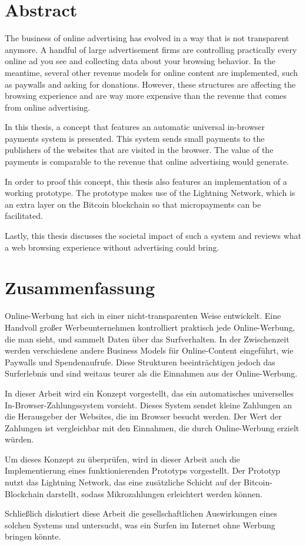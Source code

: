 \chapter*{Abstract}
\label{cha:abstract}
The business of online advertising has evolved in a way that is not transparent anymore. A handful of large advertisement firms are controlling practically every online ad you see and collecting data about your browsing behavior. In the meantime, several other revenue models for online content are implemented, such as paywalls and asking for donations. However, these structures are affecting the browsing experience and are way more expensive than the revenue that comes from online advertising. 

In this thesis, a concept that features an automatic universal in-browser payments system is presented. This system sends small payments to the publishers of the websites that are visited in the browser. The value of the payments is comparable to the revenue that online advertising would generate.

In order to proof this concept, this thesis also features an implementation of a working prototype. The prototype makes use of the Lightning Network, which is an extra layer on the Bitcoin blockchain so that micropayments can be facilitated.

Lastly, this thesis discusses the societal impact of such a system and reviews what a web browsing experience without advertising could bring. 

\chapter*{Zusammenfassung}
\label{cha:abstract}
Online-Werbung hat sich in einer nicht-transparenten Weise entwickelt. Eine Handvoll großer Werbeunternehmen kontrolliert praktisch jede Online-Werbung, die man sieht, und sammelt Daten über das Surfverhalten. In der Zwischenzeit werden verschiedene andere Business Models für Online-Content eingeführt, wie Paywalls und Spendenaufrufe. Diese Strukturen beeinträchtigen jedoch das Surferlebnis und sind weitaus teurer als die Einnahmen aus der Online-Werbung.

In dieser Arbeit wird ein Konzept vorgestellt, das ein automatisches universelles In-Browser-Zahlungssystem vorsieht. Dieses System sendet kleine Zahlungen an die Herausgeber der Websites, die im Browser besucht werden. Der Wert der Zahlungen ist vergleichbar mit den Einnahmen, die durch Online-Werbung erzielt würden.

Um dieses Konzept zu überprüfen, wird in dieser Arbeit auch die Implementierung eines funktionierenden Prototyps vorgestellt. Der Prototyp nutzt das Lightning Network, das eine zusätzliche Schicht auf der Bitcoin-Blockchain darstellt, sodass Mikrozahlungen erleichtert werden können.

Schließlich diskutiert diese Arbeit die gesellschaftlichen Auswirkungen eines solchen Systems und untersucht, was ein Surfen im Internet ohne Werbung bringen könnte.